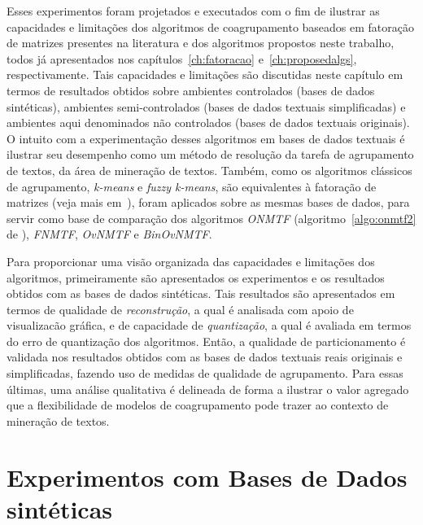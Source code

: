 \documentclass[
    12pt,                %
    oneside,            %
    a4paper,            %
    english,            %
    brazil                %
    ]{abntex2ppgsi}
\begin{document}
Esses experimentos foram projetados e executados com o fim de ilustrar as capacidades e limitações dos algoritmos de coagrupamento baseados em fatoração de matrizes presentes na literatura e dos algoritmos propostos neste trabalho, todos já apresentados nos capítulos~\ref{ch:fatoracao} e~\ref{ch:proposedalgs}, respectivamente.
Tais capacidades e limitações são discutidas neste capítulo em termos de resultados obtidos sobre ambientes controlados (bases de dados sintéticas), ambientes semi-controlados (bases de dados textuais simplificadas) e ambientes aqui denominados não controlados (bases de dados textuais originais).
O intuito com a experimentação desses algoritmos em bases de dados textuais é ilustrar seu desempenho como um método de resolução da tarefa de agrupamento de textos, da área de mineração de textos.
Também, como os algoritmos clássicos de agrupamento, \textit{k-means} e \textit{fuzzy k-means}, são equivalentes à fatoração de matrizes (veja mais em~\cite{Ding05}), foram aplicados sobre as mesmas bases de dados, para servir como base de comparação dos algoritmos \textit{ONMTF} (algoritmo~\ref{algo:onmtf2} de ), \textit{FNMTF}, \textit{OvNMTF} e \textit{BinOvNMTF}.


Para proporcionar uma visão organizada das capacidades e limitações dos algoritmos, primeiramente são apresentados os experimentos e os resultados obtidos com as bases de dados sintéticas.
Tais resultados são apresentados em termos de qualidade de \textit{reconstrução}, a qual é analisada com apoio de visualizacão gráfica, e de capacidade de \textit{quantização}, a qual é avaliada em termos do erro de quantização dos algoritmos.
Então, a qualidade de particionamento é validada nos resultados obtidos com as bases de dados textuais reais originais e simplificadas, fazendo uso de medidas de qualidade de agrupamento.
Para essas últimas, uma análise qualitativa é delineada de forma a ilustrar o valor agregado que a flexibilidade de modelos de coagrupamento pode trazer ao contexto de mineração de textos.

\section{Experimentos com Bases de Dados sintéticas}
\label{sec:experiments:synthetic}
\end{document}
